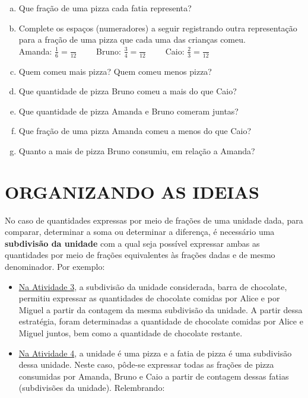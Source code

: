 \begin{atividade}[label=chap5-ativ4]{}
\begin{enumerate}[a)]
\item  Que fração de uma pizza cada fatia representa?
 \item Complete os espaços (numeradores) a seguir registrando outra representação para a fração de uma pizza que cada uma das crianças comeu.\\ Amanda: $\frac{1}{6} =\frac{}{12}  \quad \quad$ Bruno: $\frac{3}{4} =\frac{}{12} \quad \quad$ Caio: $\frac{2}{3} =\frac{}{12}$
 \item Quem comeu mais pizza? Quem comeu menos pizza?
 \item Que quantidade de pizza Bruno comeu a mais do que Caio?
 \item Que quantidade de pizza Amanda e Bruno comeram juntas?
  \item Que fração de uma pizza Amanda comeu a menos do que Caio?
  \item Quanto a mais de pizza Bruno consumiu, em relação a Amanda?
\end{enumerate}
\end{atividade}

\section{ORGANIZANDO AS IDEIAS }

No caso de quantidades expressas por meio de frações de uma unidade dada, para comparar, determinar a soma ou determinar a diferença, é necessário uma {\bf subdivisão da unidade} com a qual seja possível expressar ambas as quantidades por meio de frações equivalentes às frações dadas e de mesmo denominador. Por exemplo:
\begin{itemize} %
  \item    \hyperref[chap5-ativ3]{Na Atividade 3}, a subdivisão da unidade considerada, barra de chocolate, permitiu expressar as quantidades de chocolate comidas por Alice e por Miguel a partir da contagem da mesma subdivisão da unidade. A partir dessa estratégia, foram determinadas a quantidade de chocolate comidas por Alice e Miguel juntos, bem como a quantidade de chocolate restante.
  \item     \hyperref[chap5-ativ4]{Na Atividade 4}, a unidade é uma pizza e a fatia de pizza é uma subdivisão dessa unidade. Neste caso, pôde-se expressar todas as frações de pizza consumidas por Amanda, Bruno e Caio a partir de contagem dessas fatias (subdivisões da unidade). Relembrando:
\end{itemize} %

